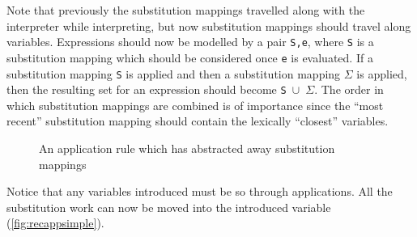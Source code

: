 \documentclass[11pt,oneside,a4paper]{report}
\begin{document}
Note that previously the substitution mappings travelled along with the interpreter while interpreting, but now substitution mappings should travel along variables.
Expressions should now be modelled by a pair \texttt{S,e}, where \texttt{S} is a substitution mapping which should be considered once \texttt{e} is evaluated. 
If a substitution mapping \texttt{S} is applied and then a substitution mapping $\Sigma$ is applied, then the resulting set for an expression should become \texttt{S $\cup$ $\Sigma$}.
The order in which substitution mappings are combined is of importance since the ``most recent'' substitution mapping should contain the lexically ``closest'' variables.
\begin{figure}[ht]
    \begin{mdframed}[style=style1]
        \vspace*{0.4cm}
          \begin{prooftree}
          \end{prooftree}   
    \end{mdframed}
    \caption{An application rule which has abstracted away substitution mappings}
    \label{fig:recappsimple}
\end{figure}
Notice that any variables introduced must be so through applications.
All the substitution work can now be moved into the introduced variable (\autoref{fig:recappsimple}).
\end{document}
